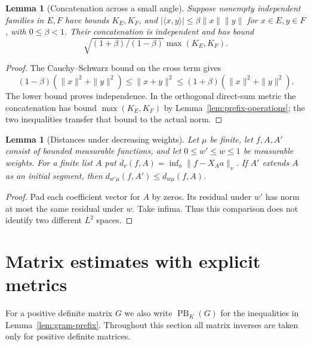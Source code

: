 \documentclass[reqno,a4paper,12pt]{amsart}
\newtheorem{lemma}[theorem]{Lemma}
\theoremstyle{definition}
\newcommand{\ip}[2]{\langle #1,#2\rangle}
\newcommand{\PB}{\operatorname{PB}}
\begin{document}
\begin{lemma}[Concatenation across a small angle]\label{lem:angle}
Suppose nonempty independent families in $E,F$ have bounds $K_E,K_F$, and
$|\ip{x}{y}|\le\beta\|x\|\|y\|$ for $x\in E,y\in F$, with $0\le\beta<1$.
Their concatenation is independent and has bound
\[
 \sqrt{(1+\beta)/(1-\beta)}\max(K_E,K_F).
\]
\end{lemma}
\begin{proof}
The Cauchy--Schwarz bound on the cross term gives
\[
 (1-\beta)(\|x\|^2+\|y\|^2)\le\|x+y\|^2
 \le(1+\beta)(\|x\|^2+\|y\|^2).
\]
The lower bound proves independence. In the orthogonal direct-sum
metric the concatenation has bound $\max(K_E,K_F)$ by
Lemma~\ref{lem:prefix-operations}; the two inequalities transfer that
bound to the actual norm.
\end{proof}

\begin{lemma}[Distances under decreasing weights]\label{lem:distance-monotone}
Let $\mu$ be finite, let $f,A,A'$ consist of bounded measurable
functions, and let $0\le w'\le w\le1$ be measurable weights.
For a finite list $A$ put
$d_\nu(f,A)=\inf_a\|f-X_Aa\|_\nu$.
If $A'$ extends $A$ as an initial
segment, then $d_{w'\mu}(f,A')\le d_{w\mu}(f,A)$.
\end{lemma}
\begin{proof}
Pad each coefficient vector for $A$ by zeros. Its residual under $w'$
has norm at most the same residual under $w$. Take infima.
Thus this comparison does not identify two different $L^2$ spaces.
\end{proof}

\section{Matrix estimates with explicit metrics}
For a positive definite matrix $G$ we also write $\PB_K(G)$ for the
inequalities in Lemma~\ref{lem:gram-prefix}. Throughout this section
all matrix inverses are taken only for positive definite matrices.
\end{document}
